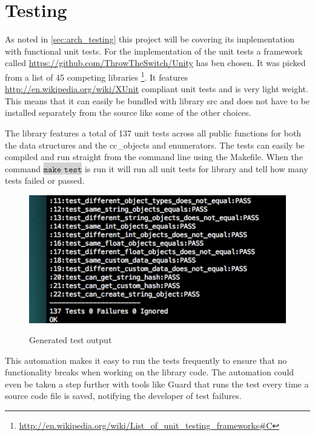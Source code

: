 \documentclass[table]{ituthesis}
\newcommand{\highlight}[1]{\colorbox{lightGray}{$\displaystyle \texttt{#1}$}}
\begin{document}
\section{Testing}

	As noted in \autoref{sec:arch_testing} this project will be covering its implementation with functional unit tests. For the implementation of the unit tests a framework called \href{Unity}{https://github.com/ThrowTheSwitch/Unity} has ben chosen. It was picked from a list of 45 competing libraries \footnote{\href{http://en.wikipedia.org/wiki/List\_of\_unit\_testing\_frameworks\#C}{http://en.wikipedia.org/wiki/List\_of\_unit\_testing\_frameworks\#C}}. It features \href{xUnit}{http://en.wikipedia.org/wiki/XUnit} compliant unit tests and is very light weight. This means that it can easily be bundled with library src and does not have to be installed separately from the source like some of the other choices.

	The library features a total of 137 unit tests across all public functions for both the data structures and the cc\_objects and enumerators. The tests can easily be compiled and run straight from the command line using the Makefile. When the command \highlight{make test} is run it will run all unit tests for library and tell how many tests failed or passed.
	
	\begin{figure}[ht!]
		\includegraphics{images/test_output.png}
		\label{fig:generate_test_output}
		\caption{Generated test output}
	\end{figure}
	
	This automation makes it easy to run the tests frequently to ensure that no functionality breaks when working on the library code. The automation could even be taken a step further with tools like Guard that runs the test every time a source code file is saved, notifying the developer of test failures.
\end{document}
